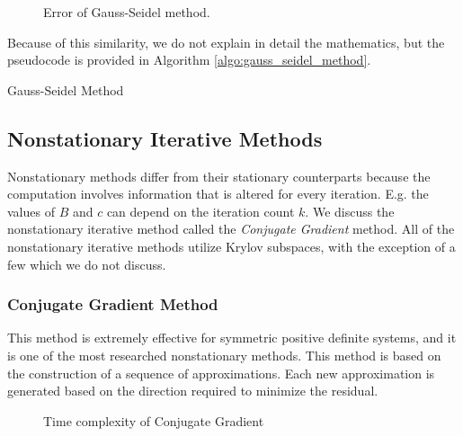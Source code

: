 \documentclass[../fem.tex]{subfile}
\begin{document}
\begin{figure}[htpb]
  \centering
  
  \caption{Error of Gauss-Seidel method.}
  \label{fig:gs_err}
\end{figure}

Because of this similarity, we do not explain in detail the mathematics, but the
pseudocode is provided in Algorithm \ref{algo:gauss_seidel_method}.

\begin{algorithm}[H]
  \caption{Gauss-Seidel Method}\label{algo:gauss_seidel_method}
  \begin{algorithmic}
    \EndFor
    \EndFor
    \EndIf
    \EndFor
  \end{algorithmic}
\end{algorithm}

\subsection{Nonstationary Iterative Methods}%
\label{sub:nonstationary_iterative_methods}

Nonstationary methods differ from their stationary counterparts because the
computation involves information that is altered for every iteration. E.g. the
values of $B$ and $c$ can depend on the iteration count $k$. We discuss the
nonstationary iterative method called the  \textit{Conjugate Gradient} method.
All of the nonstationary iterative methods utilize Krylov subspaces, with the
exception of a few which we do not discuss.

\subsubsection{Conjugate Gradient Method}%
\label{ssub:conjugate_gradient_method}

This method is extremely effective for symmetric positive definite systems, and
it is one of the most researched nonstationary methods. This method is based on
the construction of a sequence of approximations. Each new approximation is
generated based on the direction required to minimize the residual.

\begin{figure}[htpb]
  \centering
  
  \caption{Time complexity of Conjugate Gradient}
  \label{fig:cg_time}
\end{figure}
\end{document}
